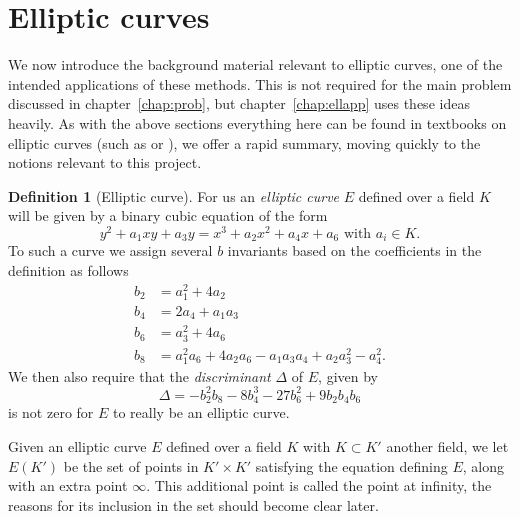 \documentclass[12pt,a4paper,abstracton,bibtotoc]{scrreprt}
\theoremstyle{definition}
\newtheorem{defn}{Definition}
\begin{document}
%


\section{Elliptic curves}
\label{sec:ell}

We now introduce the background material relevant to elliptic curves, one of the intended applications of these methods.
This is not required for the main problem discussed in chapter~\ref{chap:prob}, but chapter~\ref{chap:ellapp} uses these ideas heavily.
As with the above sections everything here can be found in textbooks on elliptic curves (such as \cite{knapp} or \cite{cassels}), we offer a rapid summary, moving quickly to the notions relevant to this project.

\begin{defn}[Elliptic curve]
For us an \emph{elliptic curve} $E$ defined over a field $K$ will be given by a binary cubic equation of the form
\[
y^2 + a_1xy + a_3y = x^3 + a_2x^2 + a_4x + a_6\text{ with }a_i\in K.
\]
To such a curve we assign several $b$ invariants based on the coefficients in the definition as follows
\begin{align*}
b_2 &= a_1^2 + 4a_2\\
b_4 &= 2a_4 + a_1a_3\\
b_6 &= a_3^2 + 4a_6\\
b_8 &= a_1^2a_6 + 4a_2a_6 - a_1a_3a_4 + a_2a_3^2 -a_4^2.
\end{align*}
We then also require that the \emph{discriminant} $\Delta$ of $E$, given by
\[
\Delta = -b_2^2b_8 -8b_4^3 -27b_6^2 +9b_2b_4b_6
\]
is not zero for $E$ to really be an elliptic curve.

Given an elliptic curve $E$ defined over a field $K$ with $K \subset K'$ another field, we let $E(K')$ be the set of points in $K'\times K'$ satisfying the equation defining $E$, along with an extra point $\infty$.
This additional point is called the point at infinity, the reasons for its inclusion in the set should become clear later.
\end{defn}
\end{document}

